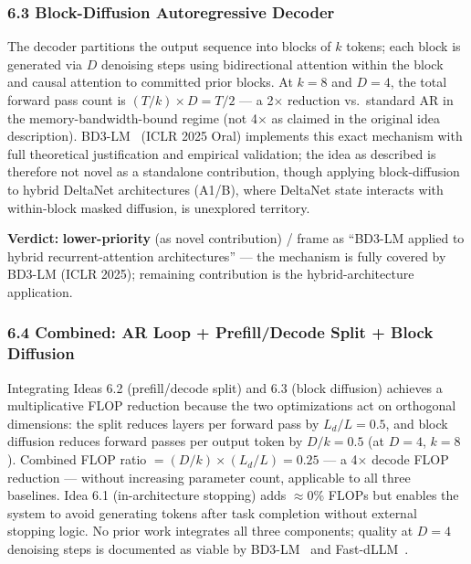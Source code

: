 \documentclass[11pt]{article}
\begin{document}
\subsubsection{6.3 Block-Diffusion Autoregressive Decoder}
\label{sec:idea_6_3}

The decoder partitions the output sequence into blocks of $k$ tokens; each block is generated via $D$ denoising steps using bidirectional attention within the block and causal attention to committed prior blocks.
At $k=8$ and $D=4$, the total forward pass count is $(T/k) \times D = T/2$ --- a 2$\times$ reduction vs.\ standard AR in the memory-bandwidth-bound regime (not 4$\times$ as claimed in the original idea description).
BD3-LM~\cite{Nie2025BD3LM} (ICLR 2025 Oral) implements this exact mechanism with full theoretical justification and empirical validation; the idea as described is therefore not novel as a standalone contribution, though applying block-diffusion to hybrid DeltaNet architectures (A1/B), where DeltaNet state interacts with within-block masked diffusion, is unexplored territory.

\textbf{Verdict:} \textbf{lower-priority} (as novel contribution) / frame as ``BD3-LM applied to hybrid recurrent-attention architectures'' --- the mechanism is fully covered by BD3-LM (ICLR 2025); remaining contribution is the hybrid-architecture application.

\subsubsection{6.4 Combined: AR Loop + Prefill/Decode Split + Block Diffusion}
\label{sec:idea_6_4}

Integrating Ideas 6.2 (prefill/decode split) and 6.3 (block diffusion) achieves a multiplicative FLOP reduction because the two optimizations act on orthogonal dimensions: the split reduces layers per forward pass by $L_d/L = 0.5$, and block diffusion reduces forward passes per output token by $D/k = 0.5$ (at $D = 4$, $k = 8$).
Combined FLOP ratio $= (D/k) \times (L_d/L) = 0.25$ --- a 4$\times$ decode FLOP reduction --- without increasing parameter count, applicable to all three baselines.
Idea 6.1 (in-architecture stopping) adds $\approx$0\% FLOPs but enables the system to avoid generating tokens after task completion without external stopping logic.
No prior work integrates all three components; quality at $D = 4$ denoising steps is documented as viable by BD3-LM~\cite{Nie2025BD3LM} and Fast-dLLM~\cite{FastdLLM2025}.
\end{document}
